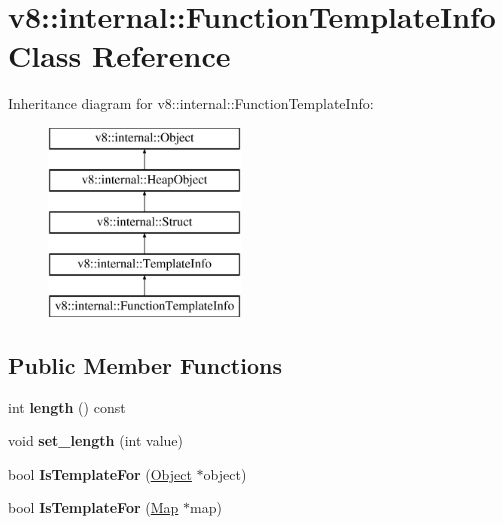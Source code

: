\hypertarget{classv8_1_1internal_1_1_function_template_info}{}\section{v8\+:\+:internal\+:\+:Function\+Template\+Info Class Reference}
\label{classv8_1_1internal_1_1_function_template_info}
Inheritance diagram for v8\+:\+:internal\+:\+:Function\+Template\+Info\+:\begin{figure}[H]
\begin{center}
\leavevmode
\includegraphics[height=5.000000cm]{classv8_1_1internal_1_1_function_template_info}
\end{center}
\end{figure}
\subsection*{Public Member Functions}
\begin{DoxyCompactItemize}
\item 
\hypertarget{classv8_1_1internal_1_1_function_template_info_a6d8bda16d223be7b324990226db7cadb}{}int {\bfseries length} () const \label{classv8_1_1internal_1_1_function_template_info_a6d8bda16d223be7b324990226db7cadb}

\item 
\hypertarget{classv8_1_1internal_1_1_function_template_info_a53eeebcf90c65b5dcfe97b7cb452f0bc}{}void {\bfseries set\+\_\+length} (int value)\label{classv8_1_1internal_1_1_function_template_info_a53eeebcf90c65b5dcfe97b7cb452f0bc}

\item 
\hypertarget{classv8_1_1internal_1_1_function_template_info_ac8ff72779008703bc0dd4f7ab12c56bb}{}bool {\bfseries Is\+Template\+For} (\hyperlink{classv8_1_1internal_1_1_object}{Object} $\ast$object)\label{classv8_1_1internal_1_1_function_template_info_ac8ff72779008703bc0dd4f7ab12c56bb}

\item 
\hypertarget{classv8_1_1internal_1_1_function_template_info_a4697f335fb987b0a42d1167b89ec330f}{}bool {\bfseries Is\+Template\+For} (\hyperlink{classv8_1_1internal_1_1_map}{Map} $\ast$map)\label{classv8_1_1internal_1_1_function_template_info_a4697f335fb987b0a42d1167b89ec330f}

\end{DoxyCompactItemize}
